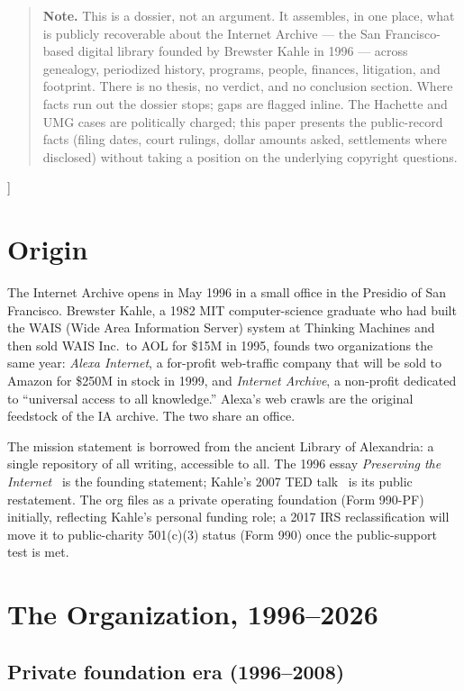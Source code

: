 \documentclass[10pt,letterpaper,twocolumn]{article}
\begin{document}
{\begin{quote}
\small\noindent\textbf{Note.} This is a dossier, not an argument. It assembles, in one place, what is publicly recoverable about the Internet Archive --- the San Francisco-based digital library founded by Brewster Kahle in 1996 --- across genealogy, periodized history, programs, people, finances, litigation, and footprint. There is no thesis, no verdict, and no conclusion section. Where facts run out the dossier stops; gaps are flagged inline. The Hachette and UMG cases are politically charged; this paper presents the public-record facts (filing dates, court rulings, dollar amounts asked, settlements where disclosed) without taking a position on the underlying copyright questions.
\end{quote}
\vspace{0.5em}
}]

\section{Origin}

The Internet Archive opens in May 1996 in a small office in the Presidio of San Francisco. Brewster Kahle, a 1982 MIT computer-science graduate who had built the WAIS (Wide Area Information Server) system at Thinking Machines and then sold WAIS Inc.~to AOL for \$15M in 1995, founds two organizations the same year: \emph{Alexa Internet}, a for-profit web-traffic company that will be sold to Amazon for \$250M in stock in 1999, and \emph{Internet Archive}, a non-profit dedicated to ``universal access to all knowledge.'' Alexa's web crawls are the original feedstock of the IA archive. The two share an office.

The mission statement is borrowed from the ancient Library of Alexandria: a single repository of all writing, accessible to all. The 1996 essay \emph{Preserving the Internet}~\citep{kahle1996preserving} is the founding statement; Kahle's 2007 TED talk~\citep{kahle2007universal} is its public restatement. The org files as a private operating foundation (Form 990-PF) initially, reflecting Kahle's personal funding role; a 2017 IRS reclassification will move it to public-charity 501(c)(3) status (Form 990) once the public-support test is met.

\section{The Organization, 1996--2026}

\subsection{Private foundation era (1996--2008)}
\end{document}
